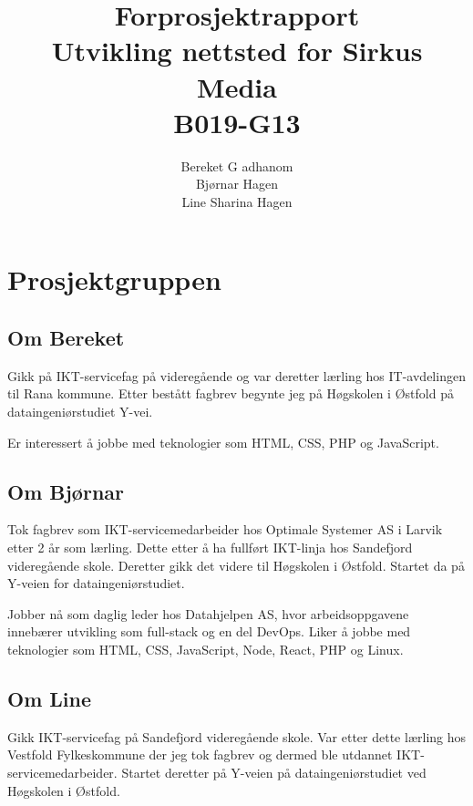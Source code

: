\documentclass[11pt,a4paper]{report}
\begin{document}
\title{
\LARGE
Forprosjektrapport \\
\vspace{2cm}
Utvikling nettsted for Sirkus Media \\
\vspace{2cm}
\Huge
B019-G13
}
\author{
\LARGE 
Bereket G adhanom \\
\LARGE 
Bjørnar Hagen \\
\LARGE 
Line Sharina Hagen
}
\maketitle

\section*{Prosjektgruppen}

\subsection*{Om Bereket}
Gikk på IKT-servicefag på  videregående og var deretter lærling hos IT-avdelingen til Rana kommune. Etter bestått fagbrev begynte jeg på Høgskolen i Østfold på dataingeniørstudiet Y-vei.

Er interessert å jobbe med teknologier som HTML, CSS, PHP og JavaScript.

\subsection*{Om Bjørnar}
Tok fagbrev som IKT-servicemedarbeider hos Optimale Systemer AS i Larvik etter 2 år som lærling. Dette etter å ha fullført IKT-linja hos Sandefjord videregående skole. Deretter gikk det videre til Høgskolen i Østfold. Startet da på Y-veien for dataingeniørstudiet.

Jobber nå som daglig leder hos Datahjelpen AS, hvor arbeidsoppgavene innebærer utvikling som full-stack og en del DevOps. Liker å jobbe med teknologier som HTML, CSS, JavaScript, Node, React, PHP og Linux.

\subsection*{Om Line}
Gikk IKT-servicefag på Sandefjord videregående skole. Var etter dette lærling hos Vestfold Fylkeskommune der jeg tok fagbrev og dermed ble utdannet IKT-servicemedarbeider. Startet deretter på Y-veien på dataingeniørstudiet ved Høgskolen i Østfold. 
\end{document}
